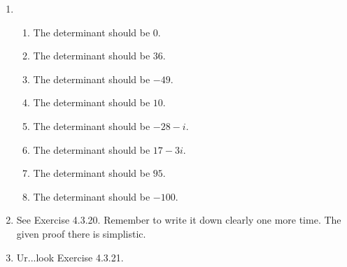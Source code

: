 \begin{enumerate}
\begin{enumerate}
\end{enumerate}
\item \begin{enumerate}
\item The determinant should be $0$.
\item The determinant should be $36$.
\item The determinant should be $-49$.
\item The determinant should be $10$.
\item The determinant should be $-28-i$.
\item The determinant should be $17-3i$.
\item The determinant should be $95$.
\item The determinant should be $-100$.
\end{enumerate}
\item See Exercise 4.3.20. Remember to write it down clearly one more time. The given proof there is simplistic.
\item Ur...look Exercise 4.3.21.
\end{enumerate}
